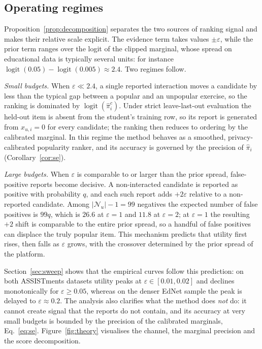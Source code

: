 \documentclass[pdflatex,sn-basic,Numbered]{sn-jnl}
\theoremstyle{plain}
\theoremstyle{remark}
\theoremstyle{definition}
\newcommand{\eps}{\varepsilon}
\newcommand{\logit}{\operatorname{logit}}
\begin{document}
\subsection{Operating regimes}\label{sec:regimes}

Proposition~\ref{prop:decomposition} separates the two sources of ranking signal and makes their relative scale explicit. The evidence term takes values $\pm\eps$, while the prior term ranges over the logit of the clipped marginal, whose spread on educational data is typically several units: for instance $\logit(0.05)-\logit(0.005)\approx2.4$. Two regimes follow.

\emph{Small budgets.} When $\eps\ll 2.4$, a single reported interaction moves a candidate by less than the typical gap between a popular and an unpopular exercise, so the ranking is dominated by $\logit(\hat\pi_i^{c})$. Under strict leave-last-out evaluation the held-out item is absent from the student's training row, so its report is generated from $x_{u,i}=0$ for every candidate; the ranking then reduces to ordering by the calibrated marginal. In this regime the method behaves as a smoothed, privacy-calibrated popularity ranker, and its accuracy is governed by the precision of $\hat\pi_i$ (Corollary~\ref{cor:se}).

\emph{Large budgets.} When $\eps$ is comparable to or larger than the prior spread, false-positive reports become decisive. A non-interacted candidate is reported as positive with probability $q$, and each such report adds $+2\eps$ relative to a non-reported candidate. Among $|\mathcal{N}_u|-1=99$ negatives the expected number of false positives is $99q$, which is $26.6$ at $\eps=1$ and $11.8$ at $\eps=2$; at $\eps=1$ the resulting $+2$ shift is comparable to the entire prior spread, so a handful of false positives can displace the truly popular item. This mechanism predicts that utility first rises, then falls as $\eps$ grows, with the crossover determined by the prior spread of the platform.

Section~\ref{sec:sweep} shows that the empirical curves follow this prediction: on both ASSISTments datasets utility peaks at $\eps\in[0.01,0.02]$ and declines monotonically for $\eps\ge0.05$, whereas on the denser EdNet sample the peak is delayed to $\eps\approx0.2$. The analysis also clarifies what the method does \emph{not} do: it cannot create signal that the reports do not contain, and its accuracy at very small budgets is bounded by the precision of the calibrated marginals, Eq.~\eqref{eq:se}. Figure~\ref{fig:theory} visualises the channel, the marginal precision and the score decomposition.
\end{document}
